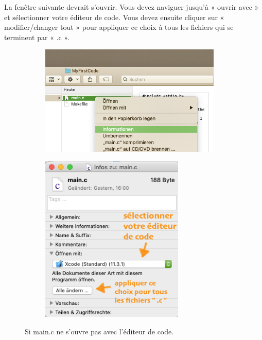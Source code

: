 \documentclass{article}
\begin{document}
La fenêtre suivante devrait s'ouvrir. Vous devez naviguer jusqu'à « ouvrir avec » et sélectionner votre éditeur de code. Vous devez ensuite cliquer sur « modifier/changer tout  » pour appliquer ce choix à tous les fichiers qui se terminent par « .c ».
\begin{figure}[H]
\begin{subfigure}[c]{0.5\textwidth}
\includegraphics[width=0.95\textwidth]{Plots/OpenMain.png}
\end{subfigure}
\begin{subfigure}[c]{0.5\textwidth}
\includegraphics[width=0.75\textwidth]{Plots/OpenMain2.png}
\end{subfigure}
\caption{Si main.c ne s'ouvre pas avec l'éditeur de code.}
\end{figure}
\end{document}
